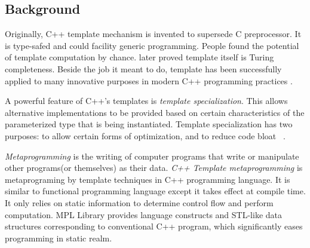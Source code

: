 \documentclass[10pt, conference, compsocconf]{IEEEtran}
\begin{document}
\subsection{Background}
Originally, C++ template mechanism is invented to supersede C
preprocessor. It is type-safed and could facility generic
programming. People found the potential of template computation by
chance. \cite{tempturing} later proved template itself is Turing
completeness. Beside the job it meant to do, template has been successfully applied to many innovative purposes in modern C++ programming practices \cite{moderncpp}. 

A powerful feature of C++'s templates is \emph{template specialization}. This allows alternative implementations to be provided based on certain characteristics of the parameterized type that is being instantiated. Template specialization has two purposes: to allow certain forms of optimization, and to reduce code bloat ~\cite{tcpl}.

\emph{Metaprogramming} is the writing of computer programs that write or
manipulate other programs(or themselves) as their data. \emph{C++ Template
 metaprogramming} is metaprograming by template techniques in
C++ programming language. It is similar to functional programming
language except it takes effect at compile time. It only relies on
static information to determine control flow and perform
computation. MPL Library \cite{mpl, tempmetaprog} provides language
constructs and STL-like data structures corresponding to conventional
C++ program, which significantly eases
programming in static realm.

\end{document}

